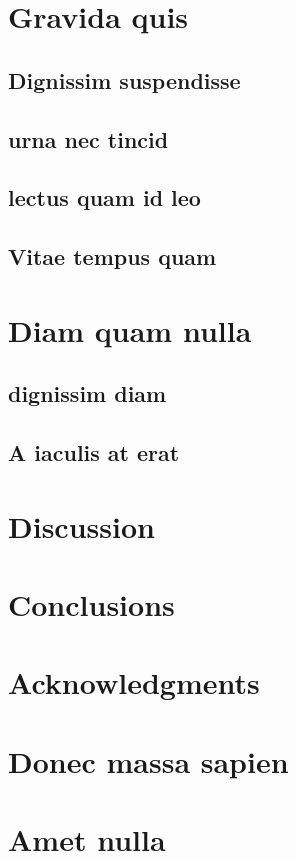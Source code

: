 \documentclass[10pt, a4paper]{article}
\numberwithin{equation}{section}
\begin{document}
\section{Gravida quis}

\subsection{Dignissim suspendisse}
\subsection{urna nec tincid}
\subsection{lectus quam id leo}
\subsection{Vitae tempus quam}

\section{Diam quam nulla}

\subsection{dignissim diam}
\subsection{A iaculis at erat}

\section{Discussion}

\section{Conclusions}

\section*{Acknowledgments}

\printbibliography

\appendix
\section{Donec massa sapien}

\section{Amet nulla}
\end{document}
